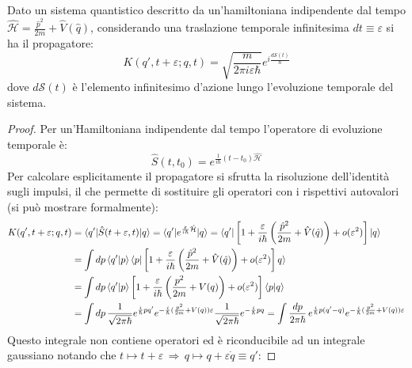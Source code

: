 \begin{proposition}
	Dato un sistema quantistico descritto da un'hamiltoniana indipendente dal tempo $ \hat{\mathcal{H}} = \frac{\hat{p}^2}{2m} + \hat{V}(\hat{q}) $, considerando una traslazione temporale infinitesima $ dt \equiv \varepsilon $ si ha il propagatore:
	\begin{equation}
		K(q',t + \varepsilon ; q,t) = \sqrt{\frac{m}{2\pi i \varepsilon \hbar}} e^{i \frac{d\mathcal{S}(t)}{\hbar}}
		\label{eq:4.16}
	\end{equation}
	dove $ d\mathcal{S}(t) $ è l'elemento infinitesimo d'azione lungo l'evoluzione temporale del sistema.
\end{proposition}
\begin{proof}
	Per un'Hamiltoniana indipendente dal tempo l'operatore di evoluzione temporale è:
	\begin{equation*}
		\hat{S}(t,t_0) = e^{\frac{1}{i\hbar} (t - t_0) \hat{\mathcal{H}}}
	\end{equation*}
	Per calcolare esplicitamente il propagatore si sfrutta la risoluzione dell'identità sugli impulsi, il che permette di sostituire gli operatori con i rispettivi autovalori (si può mostrare formalmente):
	\begin{equation*}
		\begin{split}
			K(q',t+\varepsilon ; q,t)
			&= \braket{q' | \hat{S}(t+\varepsilon,t) | q} = \braket{q' | e^{\frac{\varepsilon}{i\hbar} \hat{\mathcal{H}}} | q} = \braket{q' | \left[ 1 + \frac{\varepsilon}{i\hbar} \left( \frac{\hat{p}^2}{2m} + \hat{V}(\hat{q}) \right) + o(\varepsilon^2) \right] | q} \\
			&= \int dp \braket{q' | p} \braket{p | \left[ 1 + \frac{\varepsilon}{i\hbar} \left( \frac{\hat{p}^2}{2m} + \hat{V}(\hat{q}) \right) + o(\varepsilon^2) \right] q} \\
			&= \int dp \braket{q' | p} \left[ 1 + \frac{\varepsilon}{i\hbar} \left( \frac{p^2}{2m} + V(q) \right) + o(\varepsilon^2) \right] \braket{p | q} \\
			&= \int dp\, \frac{1}{\sqrt{2\pi\hbar}} e^{\frac{i}{\hbar} p q'} e^{- \frac{i}{\hbar} ( \frac{p^2}{2m} + V(q) ) \varepsilon} \frac{1}{\sqrt{2\pi\hbar}} e^{ - \frac{i}{\hbar} pq} = \int \frac{dp}{2\pi\hbar}\, e^{\frac{i}{\hbar} p (q' - q)} e^{- \frac{i}{\hbar} ( \frac{p^2}{2m} + V(q) ) \varepsilon}
		\end{split}
	\end{equation*}
	Questo integrale non contiene operatori ed è riconducibile ad un integrale gaussiano notando che $ t \mapsto t + \varepsilon \,\Rightarrow\, q \mapsto q + \varepsilon \dot{q} \equiv q' $:

\end{proof}
